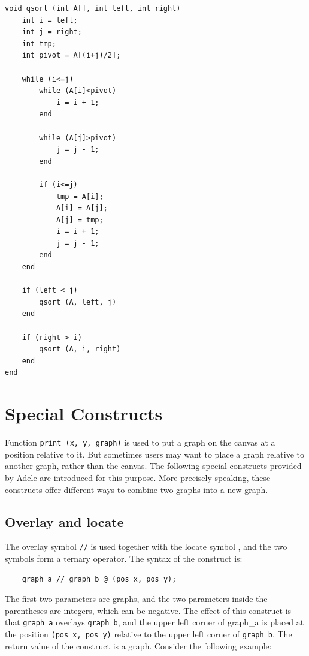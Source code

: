\documentclass[11pt,letterpaper]{article}
\begin{document}
\begin{lstlisting}[caption=qsort.adl, label=qsort, captionpos=b, frame=single, tabsize=4]
void qsort (int A[], int left, int right)
	int i = left;
	int j = right;
	int tmp;
	int pivot = A[(i+j)/2];

	while (i<=j)
		while (A[i]<pivot)
			i = i + 1;
		end
  		
		while (A[j]>pivot)
			j = j - 1;
		end
  		
  		if (i<=j)
			tmp = A[i];
			A[i] = A[j];
			A[j] = tmp;
			i = i + 1;
			j = j - 1;
		end
	end

	if (left < j)
  		qsort (A, left, j)
	end

	if (right > i)
  		qsort (A, i, right)
	end
end
\end{lstlisting}


\section {Special Constructs}

Function \texttt{print (x, y, graph)} is used to put a graph on the canvas at a position relative to it. But sometimes users may want to place a graph relative to another graph, rather than the canvas. The following special constructs provided by Adele are introduced for this purpose. More precisely speaking, these constructs offer different ways to combine two graphs into a new graph.

\subsection {Overlay and locate}

The overlay symbol \texttt{//} is used together with the locate symbol \texttt{\@}, and the two symbols form a ternary operator. The syntax of the construct is:

\begin{lstlisting}
    graph_a // graph_b @ (pos_x, pos_y);
\end{lstlisting}

The first two parameters are graphs, and the two parameters inside the parentheses are integers, which can be negative. The effect of this construct is that \texttt{graph\_a} overlays \texttt{graph\_b}, and the upper left corner of graph\_a is placed at the position \texttt{(pos\_x, pos\_y)} relative to the upper left corner of \texttt{graph\_b}. The return value of the construct is a graph. Consider the following example:
\end{document}
